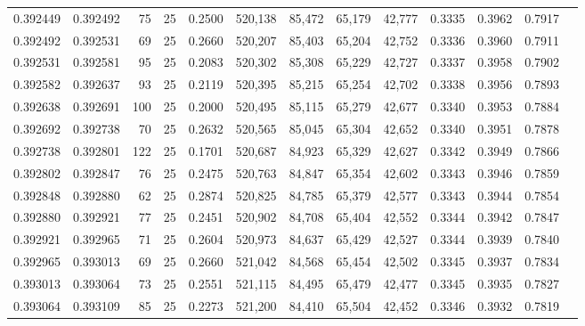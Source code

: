 \begin{tabular}{rrrrrrrrrrrrr}
0.392449 & 0.392492 &    75 &  25 &                                     0.2500 & 520,138 &  85,472 &  65,179 &  42,777 & 0.3335 & 0.3962 & 0.7917 \\
0.392492 & 0.392531 &    69 &  25 &                                     0.2660 & 520,207 &  85,403 &  65,204 &  42,752 & 0.3336 & 0.3960 & 0.7911 \\
0.392531 & 0.392581 &    95 &  25 &                                     0.2083 & 520,302 &  85,308 &  65,229 &  42,727 & 0.3337 & 0.3958 & 0.7902 \\
0.392582 & 0.392637 &    93 &  25 &                                     0.2119 & 520,395 &  85,215 &  65,254 &  42,702 & 0.3338 & 0.3956 & 0.7893 \\
0.392638 & 0.392691 &   100 &  25 &                                     0.2000 & 520,495 &  85,115 &  65,279 &  42,677 & 0.3340 & 0.3953 & 0.7884 \\
0.392692 & 0.392738 &    70 &  25 &                                     0.2632 & 520,565 &  85,045 &  65,304 &  42,652 & 0.3340 & 0.3951 & 0.7878 \\
0.392738 & 0.392801 &   122 &  25 &                                     0.1701 & 520,687 &  84,923 &  65,329 &  42,627 & 0.3342 & 0.3949 & 0.7866 \\
0.392802 & 0.392847 &    76 &  25 &                                     0.2475 & 520,763 &  84,847 &  65,354 &  42,602 & 0.3343 & 0.3946 & 0.7859 \\
0.392848 & 0.392880 &    62 &  25 &                                     0.2874 & 520,825 &  84,785 &  65,379 &  42,577 & 0.3343 & 0.3944 & 0.7854 \\
0.392880 & 0.392921 &    77 &  25 &                                     0.2451 & 520,902 &  84,708 &  65,404 &  42,552 & 0.3344 & 0.3942 & 0.7847 \\
0.392921 & 0.392965 &    71 &  25 &                                     0.2604 & 520,973 &  84,637 &  65,429 &  42,527 & 0.3344 & 0.3939 & 0.7840 \\
0.392965 & 0.393013 &    69 &  25 &                                     0.2660 & 521,042 &  84,568 &  65,454 &  42,502 & 0.3345 & 0.3937 & 0.7834 \\
0.393013 & 0.393064 &    73 &  25 &                                     0.2551 & 521,115 &  84,495 &  65,479 &  42,477 & 0.3345 & 0.3935 & 0.7827 \\
0.393064 & 0.393109 &    85 &  25 &                                     0.2273 & 521,200 &  84,410 &  65,504 &  42,452 & 0.3346 & 0.3932 & 0.7819 \\

\end{tabular}

